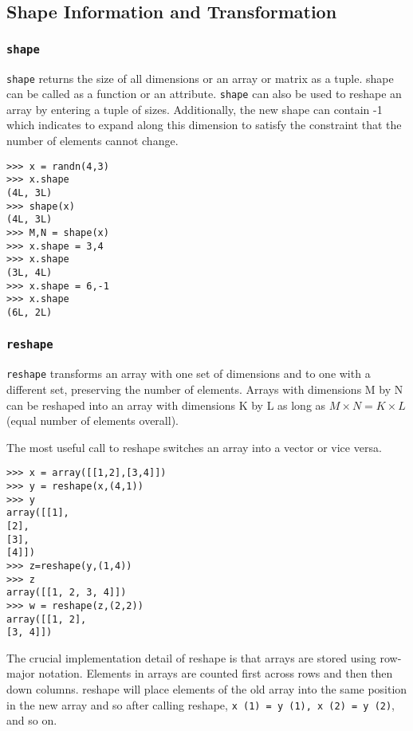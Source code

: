 \documentclass[Pydata.tex]{subfiles}
\begin{document}

\subsection{Shape Information and Transformation}

\subsubsection*{\texttt{shape}}

\texttt{shape} returns the size of all dimensions or an array or matrix as a tuple. shape can be called as a function
or an attribute. \texttt{shape} can also be used to reshape an array by entering a tuple of sizes. Additionally, the
new shape can contain -1 which indicates to expand along this dimension to satisfy the constraint that
the number of elements cannot change.
\begin{framed}
\begin{verbatim}
>>> x = randn(4,3)
>>> x.shape
(4L, 3L)
>>> shape(x)
(4L, 3L)
>>> M,N = shape(x)
>>> x.shape = 3,4
>>> x.shape
(3L, 4L)
>>> x.shape = 6,-1
>>> x.shape
(6L, 2L)
\end{verbatim}
\end{framed}
\subsubsection*{\texttt{reshape}}

\texttt{reshape}  transforms an array with one set of dimensions and to one with a different set, preserving the
number of elements. Arrays with dimensions M by N can be reshaped into an array with dimensions K
by L as long as $M \times N = K \times L$ (equal number of elements overall). 

\noindent The most useful call to reshape switches an array into a vector or vice versa.
\begin{framed}
\begin{verbatim}
>>> x = array([[1,2],[3,4]])
>>> y = reshape(x,(4,1))
>>> y
array([[1],
[2],
[3],
[4]])
>>> z=reshape(y,(1,4))
>>> z
array([[1, 2, 3, 4]])
>>> w = reshape(z,(2,2))
array([[1, 2],
[3, 4]])
\end{verbatim}
\end{framed}
The crucial implementation detail of reshape is that arrays are stored using row-major notation. Elements
in arrays are counted first across rows and then then down columns. reshape will place elements of the
old array into the same position in the new array and so after calling reshape, \texttt{x (1) = y (1), x (2) = y (2)},
and so on.
\end{document}
